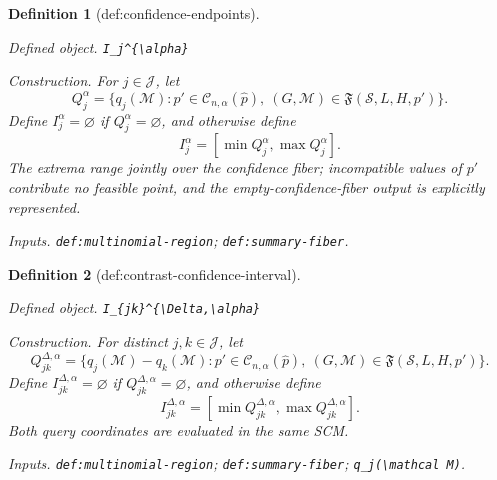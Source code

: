\documentclass{article}
\newtheorem{definition}{Definition}
\begin{document}
\begin{definition}[def:confidence-endpoints]\label{def:confidence-endpoints}
\par\smallskip\noindent\emph{Defined object.} \texttt{I\_\allowbreak{}j\textasciicircum{}\{\textbackslash{}\allowbreak{}alpha\}\allowbreak{}}
\par\smallskip\noindent\emph{Construction.} For \(j\in\mathcal J\), let
\[
Q_j^\alpha=\{q_j(\mathcal M):p'\in\mathcal C_{n,\alpha}(\widehat p),\ (G,\mathcal M)\in\mathfrak F(\mathcal S,L,H,p')\}.
\]
Define \(I_j^\alpha=\varnothing\) if \(Q_j^\alpha=\varnothing\), and otherwise define
\[
I_j^\alpha=[\min Q_j^\alpha,\max Q_j^\alpha].
\]
The extrema range jointly over the confidence fiber; incompatible values of \(p'\) contribute no feasible point, and the empty-confidence-fiber output is explicitly represented.
\par\smallskip\noindent\emph{Inputs.} \texttt{def:\allowbreak{}multinomial-\allowbreak{}region}; \texttt{def:\allowbreak{}summary-\allowbreak{}fiber}.
\end{definition}

\begin{definition}[def:contrast-confidence-interval]\label{def:contrast-confidence-interval}
\par\smallskip\noindent\emph{Defined object.} \texttt{I\_\allowbreak{}\{jk\}\allowbreak{}\textasciicircum{}\{\textbackslash{}\allowbreak{}Delta,\allowbreak{}\textbackslash{}\allowbreak{}alpha\}\allowbreak{}}
\par\smallskip\noindent\emph{Construction.} For distinct \(j,k\in\mathcal J\), let
\[
Q_{jk}^{\Delta,\alpha}
=\{q_j(\mathcal M)-q_k(\mathcal M):p'\in\mathcal C_{n,\alpha}(\widehat p),\ (G,\mathcal M)\in\mathfrak F(\mathcal S,L,H,p')\}.
\]
Define \(I_{jk}^{\Delta,\alpha}=\varnothing\) if \(Q_{jk}^{\Delta,\alpha}=\varnothing\), and otherwise define
\[
I_{jk}^{\Delta,\alpha}=[\min Q_{jk}^{\Delta,\alpha},\max Q_{jk}^{\Delta,\alpha}].
\]
Both query coordinates are evaluated in the same SCM.
\par\smallskip\noindent\emph{Inputs.} \texttt{def:\allowbreak{}multinomial-\allowbreak{}region}; \texttt{def:\allowbreak{}summary-\allowbreak{}fiber}; \texttt{q\_\allowbreak{}j(\textbackslash{}\allowbreak{}mathcal M)}.
\end{definition}
\end{document}
